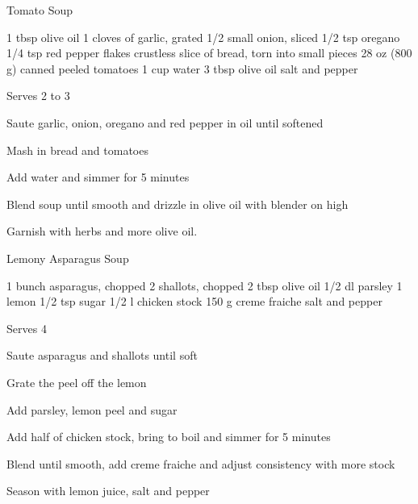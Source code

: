 \begin{denserecipe}{Tomato Soup}{\vegetarian{}}
\begin{ingredients}
1 tbsp olive oil
1 cloves of garlic, grated
1/2 small onion, sliced
1/2 tsp oregano
1/4 tsp red pepper flakes
crustless slice of bread, torn into small pieces
28 oz (800 g) canned peeled tomatoes
1 cup water
3 tbsp olive oil
salt and pepper
\end{ingredients}
\nextcolumn
Serves 2 to 3
\begin{steps}
    \item Saute garlic, onion, oregano and red pepper in oil until softened
    \item Mash in bread and tomatoes
    \item Add water and simmer for 5 minutes
    \item Blend soup until smooth and drizzle in olive oil with blender on high
\end{steps}
Garnish with herbs and more olive oil.
\end{denserecipe}

\begin{recipe}{Lemony Asparagus Soup}{\vegetarian{}}
\begin{ingredients}
1 bunch asparagus, chopped
2 shallots, chopped
2 tbsp olive oil
1/2 dl parsley
1 lemon
1/2 tsp sugar
1/2 l chicken stock
150 g creme fraiche
salt and pepper
\end{ingredients}
\nextcolumn
Serves 4
\begin{steps}
    \item Saute asparagus and shallots until soft
    \item Grate the peel off the lemon
    \item Add parsley, lemon peel and sugar
    \item Add half of chicken stock, bring to boil and simmer for 5 minutes
    \item Blend until smooth, add creme fraiche and adjust consistency with more stock
    \item Season with lemon juice, salt and pepper
\end{steps}
\end{recipe}

